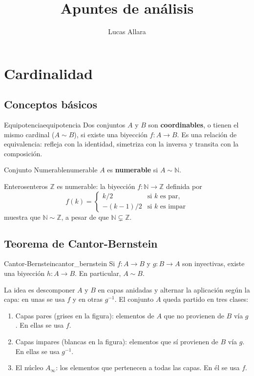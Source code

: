 \documentclass[11pt, a4paper]{article}
\title{
    \vspace{-2cm}
    \textbf{\Huge Apuntes de análisis}\\
    \vspace{0.5cm}
}
\author{Lucas Allara}
\date{}
\begin{document}
\maketitle
\newpage

\tableofcontents
\newpage

\section{Cardinalidad}

\subsection{Conceptos básicos}

\begin{definicion}{Equipotencia}{equipotencia}
Dos conjuntos $A$ y $B$ son \textbf{coordinables}, o tienen el mismo cardinal ($A \sim B$), si existe una
biyección $f: A \to B$. Es una relación de equivalencia: refleja con la identidad, simetriza con
la inversa y transita con la composición.
\end{definicion}

\begin{definicion}{Conjunto Numerable}{numerable}
$A$ es \textbf{numerable} si $A \sim \mathbb{N}$.
\end{definicion}

\begin{ejemplo}{Enteros}{enteros}
$\mathbb{Z}$ es numerable: la biyección $f: \mathbb{N} \to \mathbb{Z}$ definida por
$$
f(k) = \begin{cases}
k/2 & \text{si } k \text{ es par,} \\
-(k-1)/2 & \text{si } k \text{ es impar}
\end{cases}
$$
muestra que $\mathbb{N} \sim \mathbb{Z}$, a pesar de que $\mathbb{N} \subsetneq \mathbb{Z}$.
\end{ejemplo}

\subsection{Teorema de Cantor-Bernstein}

\begin{teorema}{Cantor-Bernstein}{cantor_bernstein}
Si $f: A \to B$ y $g: B \to A$ son inyectivas, existe una biyección $h: A \to B$. En particular,
$A \sim B$.
\end{teorema}

La idea es descomponer $A$ y $B$ en capas anidadas y alternar la aplicación según la capa: en
unas se usa $f$ y en otras $g^{-1}$. El conjunto $A$ queda partido en tres clases:
\begin{enumerate}
    \item Capas pares (grises en la figura): elementos de $A$ que no provienen de $B$ vía $g$. En
    ellas se usa $f$.
    \item Capas impares (blancas en la figura): elementos que sí provienen de $B$ vía $g$. En
    ellas se usa $g^{-1}$.
    \item El núcleo $A_\infty$: los elementos que pertenecen a todas las capas. En él se usa $f$.
\end{enumerate}
\end{document}
